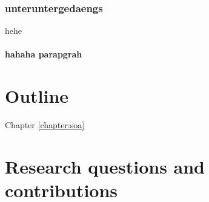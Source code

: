 \subsubsection{unteruntergedaengs}
hehe

\paragraph{hahaha parapgrah}

\section{Outline}

Chapter \ref{chapter:soa} 

\section{Research questions and contributions}
\label{sec:introduction:contributions}

\newpage\thispagestyle{empty}
